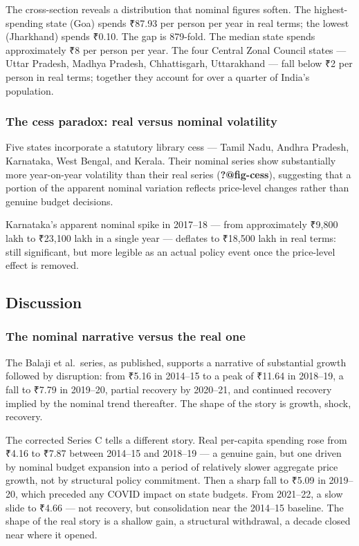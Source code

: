 \documentclass[
  11pt,
  oneside,
  10pt,
  a4paper,
  twocolumn]{article}
\begin{document}
The cross-section reveals a distribution that nominal figures soften.
The highest-spending state (Goa) spends ₹87.93 per person per year in
real terms; the lowest (Jharkhand) spends ₹0.10. The gap is 879-fold.
The median state spends approximately ₹8 per person per year. The four
Central Zonal Council states --- Uttar Pradesh, Madhya Pradesh,
Chhattisgarh, Uttarakhand --- fall below ₹2 per person in real terms;
together they account for over a quarter of India's population.

\subsubsection{The cess paradox: real versus nominal
volatility}\label{the-cess-paradox-real-versus-nominal-volatility}

Five states incorporate a statutory library cess --- Tamil Nadu, Andhra
Pradesh, Karnataka, West Bengal, and Kerala. Their nominal series show
substantially more year-on-year volatility than their real series
(\textbf{?@fig-cess}), suggesting that a portion of the apparent nominal
variation reflects price-level changes rather than genuine budget
decisions.

Karnataka's apparent nominal spike in 2017--18 --- from approximately
₹9,800 lakh to ₹23,100 lakh in a single year --- deflates to ₹18,500
lakh in real terms: still significant, but more legible as an actual
policy event once the price-level effect is removed.

\subsection{Discussion}\label{discussion}

\subsubsection{The nominal narrative versus the real
one}\label{the-nominal-narrative-versus-the-real-one}

The Balaji et al.~series, as published, supports a narrative of
substantial growth followed by disruption: from ₹5.16 in 2014--15 to a
peak of ₹11.64 in 2018--19, a fall to ₹7.79 in 2019--20, partial
recovery by 2020--21, and continued recovery implied by the nominal
trend thereafter. The shape of the story is growth, shock, recovery.

The corrected Series C tells a different story. Real per-capita spending
rose from ₹4.16 to ₹7.87 between 2014--15 and 2018--19 --- a genuine
gain, but one driven by nominal budget expansion into a period of
relatively slower aggregate price growth, not by structural policy
commitment. Then a sharp fall to ₹5.09 in 2019--20, which preceded any
COVID impact on state budgets. From 2021--22, a slow slide to ₹4.66 ---
not recovery, but consolidation near the 2014--15 baseline. The shape of
the real story is a shallow gain, a structural withdrawal, a decade
closed near where it opened.
\end{document}

